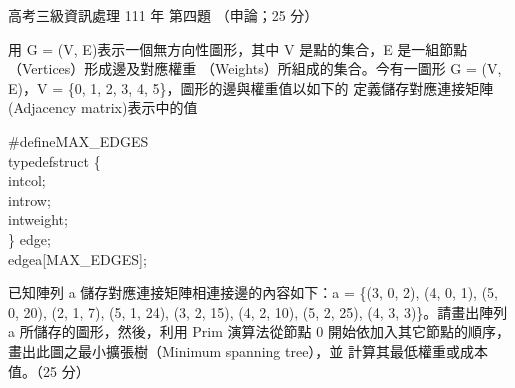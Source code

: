 \begin{pastexam}[label={px:gk3-111-ds-04}]{高考三級資訊處理 111 年 第四題}
（申論；25 分）

用 G = (V, E)表示一個無方向性圖形，其中 V 是點的集合，E 是一組節點（Vertices）形成邊及對應權重
（Weights）所組成的集合。今有一圖形 G = (V, E)，V = \{0, 1, 2, 3, 4, 5\}，圖形的邊與權重值以如下的
定義儲存對應連接矩陣(Adjacency matrix)表示中的值

\hspace*{1em}\#define\quad MAX\_EDGES\\
\hspace*{1.5em}typedef\quad struct \{\\
\hspace*{8em}int\quad col;\\
\hspace*{8em}int\quad row;\\
\hspace*{8em}int\quad weight;\\
\hspace*{8em}\} edge;\\
\hspace*{1em}edge\quad a[MAX\_EDGES];

已知陣列 a 儲存對應連接矩陣相連接邊的內容如下：a = \{(3, 0, 2), (4, 0, 1), (5, 0, 20), (2, 1, 7),
(5, 1, 24), (3, 2, 15), (4, 2, 10), (5, 2, 25), (4, 3, 3)\}。請畫出陣列 a 所儲存的圖形，然後，利用
Prim 演算法從節點 0 開始依加入其它節點的順序，畫出此圖之最小擴張樹（Minimum spanning tree），並
計算其最低權重或成本值。（25 分）
\end{pastexam}

